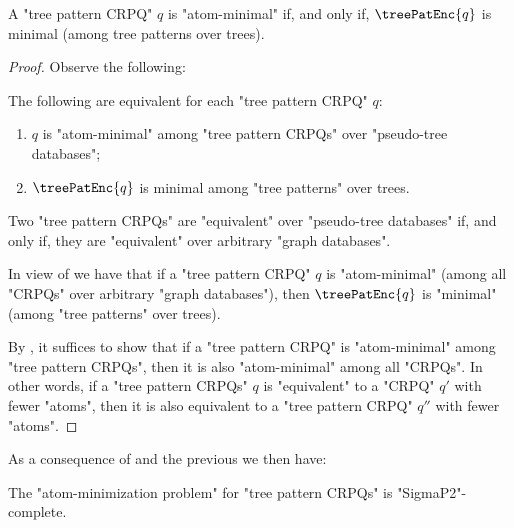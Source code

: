 \begin{lemma}\AP\label{lem:treepat-crpq}
  A "tree pattern CRPQ" $q$ is "atom-minimal" if, and only if, $\treePatEnc{q}$ is minimal (among tree patterns over trees).
\end{lemma}
\begin{proof}
  Observe the following:
  \begin{claim}\AP\label{cl:atommin-over-trees=treepatmin}
    The following are equivalent for each "tree pattern CRPQ" $q$:
    \begin{enumerate}
      \item $q$ is "atom-minimal" among "tree pattern CRPQs" over "pseudo-tree databases";
      \item $\treePatEnc{q}$ is minimal among "tree patterns" over trees.
    \end{enumerate}  
  \end{claim}
  \begin{claim}\AP\label{cl:equiv-overtrees-overgraphs}
    Two "tree pattern CRPQs" are "equivalent" over "pseudo-tree databases" if, and only if, they are "equivalent" over arbitrary "graph databases".
  \end{claim}
  In view of  we have that
    if a "tree pattern CRPQ" $q$ is "atom-minimal" (among all "CRPQs" over arbitrary "graph databases"), then $\treePatEnc{q}$ is "minimal" (among "tree patterns" over trees).

  By , it suffices to show that if a "tree pattern CRPQ" is "atom-minimal" among "tree pattern CRPQs", then it is also "atom-minimal" among all "CRPQs". In other words, if a "tree pattern CRPQs" $q$ is "equivalent" to a "CRPQ" $q'$ with fewer "atoms", then it is also equivalent to a "tree pattern CRPQ" $q''$ with fewer "atoms".
\end{proof}

As a consequence of \cite[Theorem~3.1]{min-tree-patterns} and the previous  we then have:
\begin{corollary}
  The "atom-minimization problem" for "tree pattern CRPQs" is "SigmaP2"-complete.
\end{corollary}